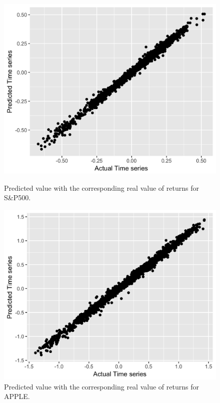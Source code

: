 \documentclass[letterpaper,12pt]{article}
\begin{document}
\begin{figure}[!tbp]
  \centering
  \begin{minipage}[t]{0.45\textwidth}
    \includegraphics[width=\textwidth]{figSVMSP500.png}
    \caption{Predicted value with the corresponding real value of returns for S\&P500.\label{fig:figSVMSP500}}
  \end{minipage}
  \hfill
  \begin{minipage}[t]{0.45\textwidth}
    \includegraphics[width=\textwidth]{figSVMAPPLE.png}
    \caption{Predicted value with the corresponding real value of returns for APPLE.\label{fig:figSVMAPPLE}}
  \end{minipage}
\end{figure}
\end{document}
